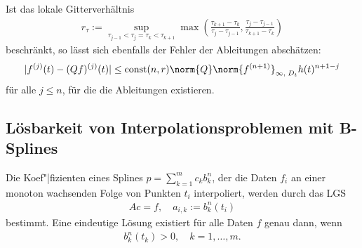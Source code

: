 Ist das lokale Gitterverhältnis
\begin{align*}
    r_\tau := \sup_{\tau_{j-1} < \tau_j = \tau_k < \tau_{k+1}} \max\left(
    \frac{\tau_{k+1} - \tau_k}{\tau_j - \tau_{j-1}},
    \frac{\tau_j - \tau_{j-1}}{\tau_{k+1} - \tau_k}\right)
\end{align*}
beschränkt, so lässt sich ebenfalls der Fehler der Ableitungen abschätzen:
\begin{align*}
    |f^{(j)}(t) - (Qf)^{(j)}(t)| \le \const(n, r)
    \norm{Q} \norm{f^{(n+1)}}_{\infty,\; D_t} h(t)^{n+1-j}
\end{align*}
für alle $j \le n$, für die die Ableitungen existieren.

\subsection{%
    Lösbarkeit von Interpolationsproblemen mit B-Splines%
}

Die Koef"|fizienten eines Splines $p = \sum_{k=1}^m c_k b_k^n$, der die Daten
$f_i$ an einer monoton wachsenden Folge von Punkten $t_i$ interpoliert, werden
durch das LGS
\begin{align*}
    Ac = f, \quad
    a_{i,k} := b_k^n(t_i)
\end{align*}
bestimmt.
Eine eindeutige Lösung existiert für alle Daten $f$ genau dann, wenn
\begin{align*}
    b_k^n(t_k) > 0, \quad
    k = 1, \dotsc, m.
\end{align*}

\pagebreak
